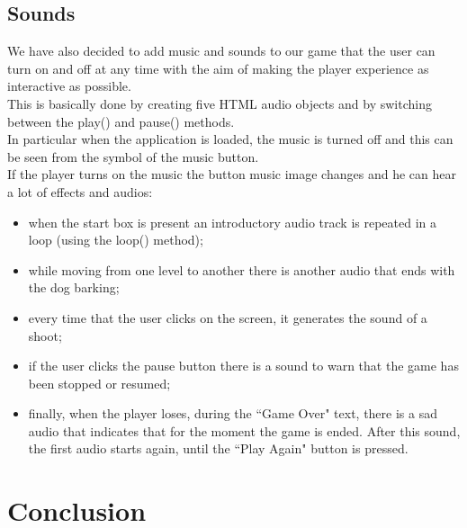 \documentclass[12pt,a4paper]{article}
\begin{document}
	\subsection{Sounds}
	We have also decided to add music and sounds to our game that the user can turn on and off at any time with the aim of making the player experience as interactive as possible.\\
	This is basically done by creating five HTML audio objects and by switching between the play() and pause() methods.\\
	In particular when the application is loaded, the music is turned off and this can be seen from the symbol of the music button.\\
	If the player turns on the music the button music image changes and he can hear a lot of effects and audios:
	\begin{itemize}
		\item when the start box is present an introductory audio track is repeated in a loop (using the loop() method);
		\item while moving from one level to another there is another audio that ends with the dog barking;
		\item every time that the user clicks on the screen, it generates the sound of a shoot;
		\item if the user clicks the pause button there is a sound to warn that the game has been stopped or resumed;
		\item finally, when the player loses, during the ``Game Over" text, there is a sad audio that indicates that for the moment the game is ended. After this sound, the first audio starts again, until the ``Play Again" button is pressed.
	\end{itemize}
	
	
	\section{Conclusion}
	
	
\end{document}
